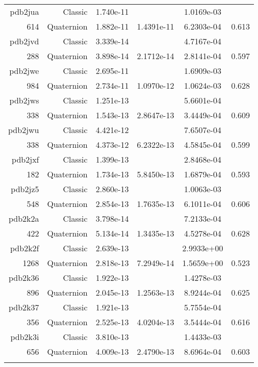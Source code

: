 \begin{xltabular}{\textwidth}{r|rS[table-format=1.3e+2]S[table-format=1.4e+2]S[table-format=1.4e+2]S[table-format=-1.3]}
pdb2jua & Classic & 1.740e-11 &  & 1.0169e-03 & \\
614 & Quaternion & 1.882e-11 & 1.4391e-11 & 6.2303e-04 & 0.613\\  \addlinespace
pdb2jvd & Classic & 3.339e-14 &  & 4.7167e-04 & \\
288 & Quaternion & 3.898e-14 & 2.1712e-14 & 2.8141e-04 & 0.597\\  \addlinespace
pdb2jwe & Classic & 2.695e-11 &  & 1.6909e-03 & \\
984 & Quaternion & 2.734e-11 & 1.0970e-12 & 1.0624e-03 & 0.628\\  \addlinespace
pdb2jws & Classic & 1.251e-13 &  & 5.6601e-04 & \\
338 & Quaternion & 1.543e-13 & 2.8647e-13 & 3.4449e-04 & 0.609\\  \addlinespace
pdb2jwu & Classic & 4.421e-12 &  & 7.6507e-04 & \\
338 & Quaternion & 4.373e-12 & 6.2322e-13 & 4.5845e-04 & 0.599\\  \addlinespace
pdb2jxf & Classic & 1.399e-13 &  & 2.8468e-04 & \\
182 & Quaternion & 1.734e-13 & 5.8450e-13 & 1.6879e-04 & 0.593\\  \addlinespace
pdb2jz5 & Classic & 2.860e-13 &  & 1.0063e-03 & \\
548 & Quaternion & 2.854e-13 & 1.7635e-13 & 6.1011e-04 & 0.606\\  \addlinespace
pdb2k2a & Classic & 3.798e-14 &  & 7.2133e-04 & \\
422 & Quaternion & 5.134e-14 & 1.3435e-13 & 4.5278e-04 & 0.628\\  \addlinespace
{\color{red} pdb2k2f } & Classic & 2.639e-13 &  & 2.9933e+00 & \\
1268 & Quaternion & 2.818e-13 & 7.2949e-14 & 1.5659e+00 & 0.523\\  \addlinespace
pdb2k36 & Classic & 1.922e-13 &  & 1.4278e-03 & \\
896 & Quaternion & 2.045e-13 & 1.2563e-13 & 8.9244e-04 & 0.625\\  \addlinespace
pdb2k37 & Classic & 1.921e-13 &  & 5.7554e-04 & \\
356 & Quaternion & 2.525e-13 & 4.0204e-13 & 3.5444e-04 & 0.616\\  \addlinespace
pdb2k3i & Classic & 3.810e-13 &  & 1.4433e-03 & \\
656 & Quaternion & 4.009e-13 & 2.4790e-13 & 8.6964e-04 & 0.603\\  \addlinespace

\end{xltabular}
